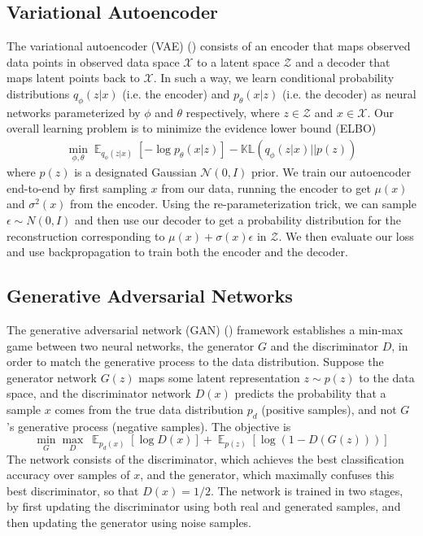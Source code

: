 \documentclass[11pt]{article}
\DeclareMathOperator{\E}{\mathbb{E}} %
\begin{document}
\subsection{Variational Autoencoder}
The variational autoencoder (VAE) (\cite{vae}) consists of an encoder that maps observed data points in observed data space $\mathcal{X}$ to a latent space $\mathcal{Z}$ and a decoder that maps latent points back to $\mathcal{X}$.  In such a way, we learn conditional probability distributions $q_\phi(z \vert x)$ (i.e. the encoder) and $p_\theta(x \vert z)$ (i.e. the decoder) as neural networks parameterized by $\phi$ and $\theta$ respectively, where $z \in \mathcal{Z}$ and $x \in \mathcal{X}$.  Our overall learning problem is to minimize the evidence lower bound (ELBO)
\begin{align*}
\min_{\phi, \theta} \E_{q_\phi(z \vert x)} [-\log p_\theta(x \vert z)] - \mathbb{KL}(q_\phi(z \vert x) || p(z))
\end{align*}  
where $p(z)$ is a designated Gaussian $\mathcal{N}(0, I)$ prior.  We train our autoencoder end-to-end by first sampling $x$ from our data, running the encoder to get $\mu(x)$ and $\sigma^2(x)$ from the encoder.  Using the re-parameterization trick, we can sample $\epsilon \sim N(0, I)$ and then use our decoder to get a probability distribution for the reconstruction corresponding to $\mu(x) + \sigma(x) \epsilon$ in $\mathcal{Z}$.  We then evaluate our loss and use backpropagation to train both the encoder and the decoder.    

\subsection{Generative Adversarial Networks} \label{sssec:gan}
The generative adversarial network (GAN) (\cite{gan}) framework establishes a min-max game between two neural networks, the generator $G$ and the discriminator $D$, in order to match the generative process to the data distribution. Suppose the generator network $G(z)$ maps some latent representation $z\sim p(z)$ to the data space, and the discriminator network $D(x)$ predicts the probability that a sample $x$ comes from the true data distribution $p_d$ (positive samples), and not $G$'s generative process (negative samples). The objective is
\begin{equation}
\min_G \max_D \ \E_{p_d(x)} [\log D(x)] + \E_{p(z)} [\log (1 - D(G(z)))]
\end{equation}
The network consists of the discriminator, which achieves the best classification accuracy over samples of $x$, and the generator, which maximally confuses this best discriminator, so that $D(x) = 1/2$. The network is trained in two stages, by first updating the discriminator using both real and generated samples, and then updating the generator using noise samples.
\end{document}
